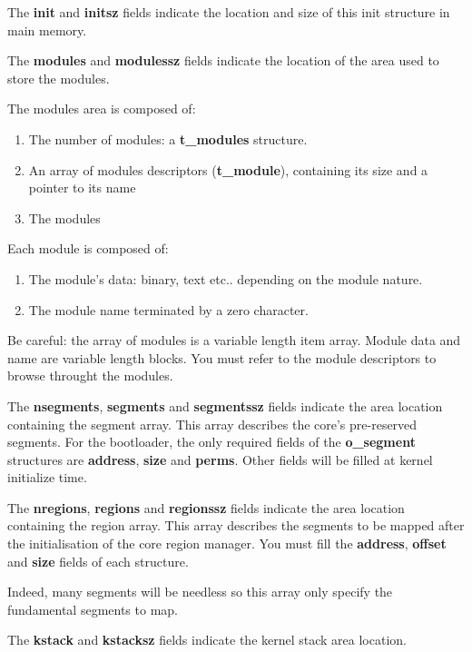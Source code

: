 The \textbf{init} and \textbf{initsz} fields indicate the location and
size of this init structure in main memory.

The \textbf{modules} and \textbf{modulessz} fields indicate the
location of the area used to store the modules.

The modules area is composed of:

\begin{enumerate}
  \item
    The number of modules: a \textbf{t\_modules} structure.
  \item
    An array  of modules descriptors  (\textbf{t\_module}), containing
    its size and a pointer to its name
  \item
    The modules
\end{enumerate}

Each module is composed of:

\begin{enumerate}
  \item
    The module's data: binary, text etc.. depending on the module nature.
  \item
    The module name terminated by a zero character.
\end{enumerate}

Be  careful:  the   array  of  modules  is  a   variable  length  item
array. Module data and name are variable length blocks. You must refer
to the module descriptors to browse throught the modules.

The  \textbf{nsegments},   \textbf{segments}  and  \textbf{segmentssz}
fields indicate  the area location containing the  segment array. This
array describes the core's  pre-reserved segments. For the bootloader,
the  only required  fields of  the \textbf{o\_segment}  structures are
\textbf{address}, \textbf{size} and  \textbf{perms}. Other fields will
be filled at kernel initialize time.

The \textbf{nregions},  \textbf{regions} and \textbf{regionssz} fields
indicate  the area location  containing the  region array.  This array
describes the  segments to be  mapped after the initialisation  of the
core   region   manager.   You   must   fill   the   \textbf{address},
\textbf{offset} and \textbf{size} fields of each structure.

Indeed, many segments will be needless so this array only specify the
fundamental segments to map.

The \textbf{kstack} and \textbf{kstacksz} fields indicate the kernel
stack area location.

